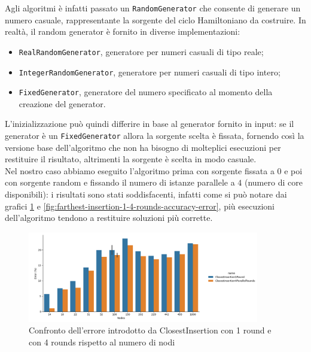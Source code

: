\noindent Agli algoritmi è infatti passato un
\texttt{RandomGenerator} che consente di generare un numero
casuale, rappresentante la sorgente del ciclo Hamiltoniano da
costruire. In realtà, il random generator è fornito in diverse
implementazioni:
\begin{itemize}
    \item \texttt{RealRandomGenerator}, generatore per numeri
      casuali di tipo reale;
    \item \texttt{IntegerRandomGenerator}, generatore per
      numeri casuali di tipo intero;
    \item \texttt{FixedGenerator}, generatore del numero
      specificato al momento della creazione del generator.
\end{itemize}
L'inizializzazione può quindi differire in base al generator fornito
in input: se il generator è un \texttt{FixedGenerator} allora
la sorgente scelta è fissata, fornendo così la versione base
dell'algoritmo che non ha bisogno di molteplici esecuzioni per
restituire il risultato, altrimenti la sorgente è scelta in modo
casuale.\\

\noindent Nel nostro caso abbiamo eseguito l'algoritmo prima con
sorgente fissata a $0$ e poi con sorgente random e fissando il numero
di istanze parallele a $4$ (numero di core disponibili): i risultati
sono stati soddisfacenti, infatti come si può notare dai grafici
\ref{fig:closest-insertion-1-4-rounds-accuracy-error} e
\ref{fig:farthest-insertion-1-4-rounds-accuracy-error}, più esecuzioni
dell'algoritmo tendono a restituire soluzioni più corrette.\\

\begin{figure}[!ht]
    \centering

    \includegraphics[width=0.9\textwidth]{./images/ClosestInsertion1Round_vs_ClosestInsertion4ParallelRounds__approximation_error_.png}

    \caption{Confronto dell'errore introdotto da ClosestInsertion con 1 round e con 4 rounds rispetto al numero di nodi}
    \label{fig:closest-insertion-1-4-rounds-accuracy-error}
\end{figure}

